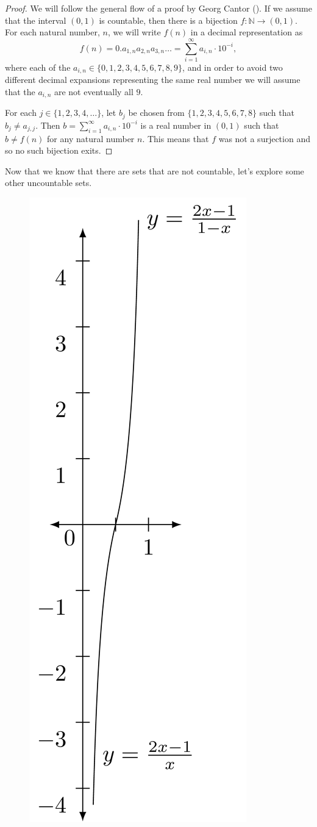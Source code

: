 \documentclass[
]{book}
\theoremstyle{definition}
\theoremstyle{definition}
\theoremstyle{definition}
\theoremstyle{remark}
\begin{document}
\begin{proof}
{}We will follow the general flow of a proof by Georg Cantor (\citeyear{Cantor}). If we assume that the interval \((0,1)\) is countable, then there is a bijection \(f:\mathbb{N}\rightarrow (0,1)\). For each natural number, \(n\), we will write \(f(n)\) in a decimal representation as
\[f(n) = 0.a_{1,n} a_{2,n} a_{3,n} \ldots = \sum_{i=1}^\infty a_{i,n} \cdot 10^{-i},\] where each of the \(a_{i,n}\in \{0,1,2,3,4,5,6,7,8,9\}\), and in order to avoid two different decimal expansions representing the same real number we will assume that the \(a_{i,n}\) are not eventually all \(9\).

For each \(j\in \{1,2,3,4,\ldots\}\), let \(b_j\) be chosen from \(\{1,2,3,4,5,6,7,8\}\) such that \(b_j\neq a_{j,j}\). Then \(b=\sum_{i=1}^\infty a_{i,n} \cdot 10^{-i}\) is a real number in \((0,1)\) such that \(b\neq f(n)\) for any natural number \(n\). This means that \(f\) was not a surjection and so no such bijection exits.
\end{proof}

Now that we know that there are sets that are not countable, let's explore some other uncountable sets.

\begin{figure}

{\centering \includegraphics[width=0.3\linewidth]{tikz/example-uncountable-bijection} 

}

\end{figure}
\end{document}
